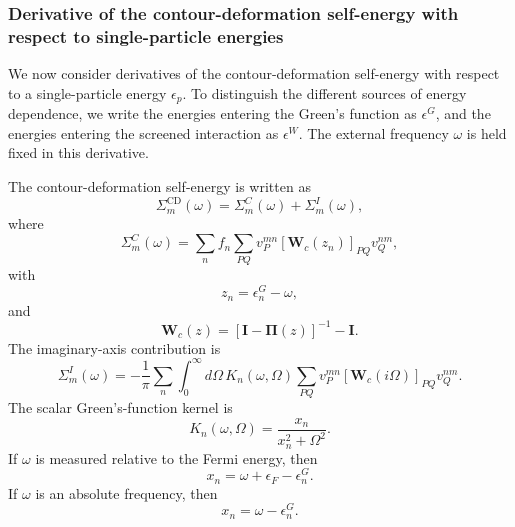 



\subsubsection{Derivative of the contour-deformation self-energy with respect to single-particle energies}

We now consider derivatives of the contour-deformation self-energy with respect
to a single-particle energy \(\epsilon_p\).  To distinguish the different
sources of energy dependence, we write the energies entering the Green's
function as \(\epsilon^G\), and the energies entering the screened interaction
as \(\epsilon^W\).  The external frequency \(\omega\) is held fixed in this
derivative.

The contour-deformation self-energy is written as
\begin{equation}
    \Sigma_m^{\mathrm{CD}}(\omega)
    =
    \Sigma_m^C(\omega)
    +
    \Sigma_m^I(\omega),
\end{equation}
where
\begin{equation}
    \Sigma_m^C(\omega)
    =
    \sum_n f_n
    \sum_{PQ}
    v_P^{mn}
    \left[
    \mathbf W_c(z_n)
    \right]_{PQ}
    v_Q^{nm},
\end{equation}
with
\begin{equation}
    z_n=\epsilon_n^G-\omega,
\end{equation}
and
\begin{equation}
    \mathbf W_c(z)
    =
    \left[
    \mathbf I-\boldsymbol{\Pi}(z)
    \right]^{-1}
    -
    \mathbf I.
\end{equation}
The imaginary-axis contribution is
\begin{equation}
    \Sigma_m^I(\omega)
    =
    -\frac{1}{\pi}
    \sum_n
    \int_0^\infty d\Omega\,
    K_n(\omega,\Omega)
    \sum_{PQ}
    v_P^{mn}
    \left[
    \mathbf W_c(i\Omega)
    \right]_{PQ}
    v_Q^{nm}.
\end{equation}
The scalar Green's-function kernel is
\begin{equation}
    K_n(\omega,\Omega)
    =
    \frac{x_n}{x_n^2+\Omega^2}.
\end{equation}
If \(\omega\) is measured relative to the Fermi energy, then
\begin{equation}
    x_n=\omega+\epsilon_F-\epsilon_n^G.
\end{equation}
If \(\omega\) is an absolute frequency, then
\begin{equation}
    x_n=\omega-\epsilon_n^G.
\end{equation}

